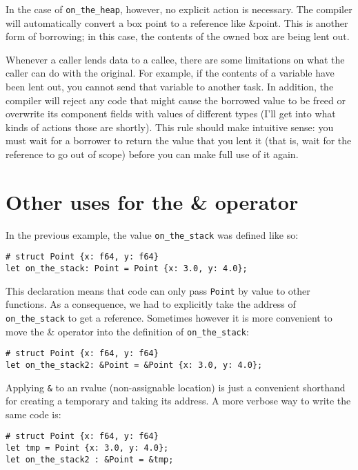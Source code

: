 \documentclass[]{article}
\begin{document}
In the case of \texttt{on\_the\_heap}, however, no explicit action is
necessary. The compiler will automatically convert a box point to a
reference like \&point. This is another form of borrowing; in this case,
the contents of the owned box are being lent out.

Whenever a caller lends data to a callee, there are some limitations on
what the caller can do with the original. For example, if the contents
of a variable have been lent out, you cannot send that variable to
another task. In addition, the compiler will reject any code that might
cause the borrowed value to be freed or overwrite its component fields
with values of different types (I'll get into what kinds of actions
those are shortly). This rule should make intuitive sense: you must wait
for a borrower to return the value that you lent it (that is, wait for
the reference to go out of scope) before you can make full use of it
again.

\section{Other uses for the \&
operator}\label{other-uses-for-the-operator}

In the previous example, the value \texttt{on\_the\_stack} was defined
like so:

\begin{verbatim}
# struct Point {x: f64, y: f64}
let on_the_stack: Point = Point {x: 3.0, y: 4.0};
\end{verbatim}

This declaration means that code can only pass \texttt{Point} by value
to other functions. As a consequence, we had to explicitly take the
address of \texttt{on\_the\_stack} to get a reference. Sometimes however
it is more convenient to move the \& operator into the definition of
\texttt{on\_the\_stack}:

\begin{verbatim}
# struct Point {x: f64, y: f64}
let on_the_stack2: &Point = &Point {x: 3.0, y: 4.0};
\end{verbatim}

Applying \texttt{\&} to an rvalue (non-assignable location) is just a
convenient shorthand for creating a temporary and taking its address. A
more verbose way to write the same code is:

\begin{verbatim}
# struct Point {x: f64, y: f64}
let tmp = Point {x: 3.0, y: 4.0};
let on_the_stack2 : &Point = &tmp;
\end{verbatim}
\end{document}
